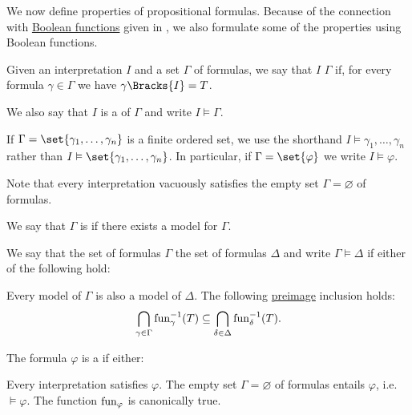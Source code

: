 \begin{definition}\label{def:propositional_semantics}
  We now define  properties of propositional formulas. Because of the connection with \hyperref[def:boolean_function]{Boolean functions} given in , we also formulate some of the properties using Boolean functions.

  \begin{thmenum}
     Given an interpretation \( I \) and a set \( \Gamma \) of formulas, we say that \( I \)  \( \Gamma \) if, for every formula \( \gamma \in \Gamma \) we have \( \gamma\Bracks{I} = T \).

    We also say that \( I \) is a  of \( \Gamma \) and write \( I \vDash \Gamma \).

    If \( \Gamma = \set{ \gamma_1, \ldots, \gamma_n } \) is a finite ordered set, we use the shorthand \( I \vDash \gamma_1, \ldots, \gamma_n \) rather than \( I \vDash \set{ \gamma_1, \ldots, \gamma_n } \). In particular, if \( \Gamma = \set{ \varphi } \) we write \( I \vDash \varphi \).

    Note that every interpretation vacuously satisfies the empty set \( \Gamma = \varnothing \) of formulas.

    We say that \( \Gamma \) is  if there exists a model for \( \Gamma \).

     We say that the set of formulas \( \Gamma \)  the set of formulas \( \Delta \) and write \( \Gamma \vDash \Delta \) if either of the following hold:
    \begin{itemize}
       Every model of \( \Gamma \) is also a model of \( \Delta \).
       The following \hyperref[def:function/preimage]{preimage} inclusion holds:
      \begin{equation*}
        \bigcap_{\gamma \in \Gamma} \operatorname{fun}_\gamma^{-1}(T) \subseteq \bigcap_{\delta \in \Delta} \operatorname{fun}_\delta^{-1}(T).
      \end{equation*}
    \end{itemize}

     The formula \( \varphi \) is a  if either:
    \begin{itemize}
       Every interpretation satisfies \( \varphi \).
       The empty set \( \Gamma = \varnothing \) of formulas entails \( \varphi \), i.e. \( \vDash \varphi \).
       The function \( \operatorname{fun}_\varphi \) is canonically true.
    \end{itemize}


\end{thmenum}
\end{definition}
